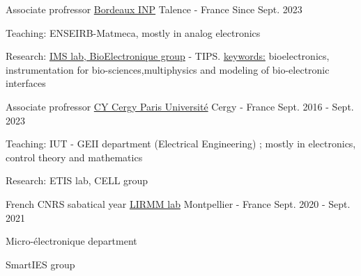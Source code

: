 

\begin{cventries}

\cventry
{Associate profressor} %
{\href{https://www.bordeaux-inp.fr/en}{Bordeaux INP}} %
{Talence - France} %
{Since Sept. 2023} %
{
  \begin{cvitems} %
    \item {Teaching: ENSEIRB-Matmeca, mostly in analog electronics}
    \item {Research: \href{https://www.ims-bordeaux.fr/research-groups/bioelectronics/}{IMS lab, BioElectronique group} - TIPS. \underline{keywords:} bioelectronics, instrumentation for bio-sciences,multiphysics and modeling of bio-electronic interfaces}
  \end{cvitems}
}

  \cventry
    {Associate profressor} %
    {\href{www.cyu.fr}{CY Cergy Paris Université}} %
    {Cergy - France} %
    {Sept. 2016 - Sept. 2023} %
    {
      \begin{cvitems} %
        \item {Teaching: IUT - GEII department (Electrical Engineering) ; mostly in electronics, control theory and mathematics}
        \item {Research: ETIS lab, CELL group}
      \end{cvitems}
    }
    
  \cventry
    {French CNRS sabatical year} %
    {\href{https://www.lirmm.fr}{LIRMM lab}} %
    {Montpellier - France} %
    {Sept. 2020 - Sept. 2021} %
    {
      \begin{cvitems} %
        \item {Micro-électronique department}
        \item {SmartIES group}
      \end{cvitems}
    }


\end{cventries}
